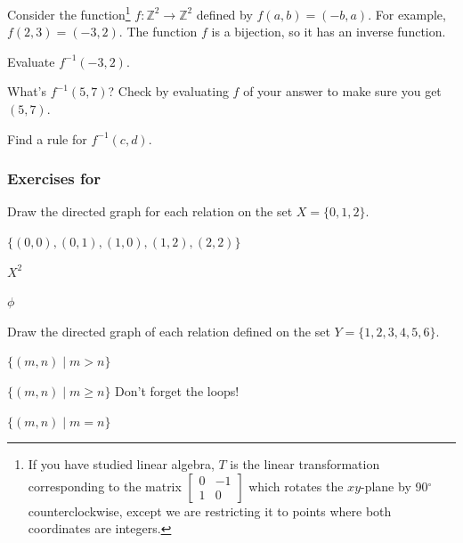 \begin{exer}[\exerE] %
\label{exer_inverse_fn_on_cart_prod}
    Consider the function\footnote{If you have studied linear algebra, $T$ is the linear transformation corresponding to the matrix
        $\left[ \begin{array}{rr} 0 & -1 \\ 1 & 0 \end{array} \right]$ which rotates the $xy$-plane by 90$^\circ$ counterclockwise, except we are restricting it to points where both coordinates are integers.} $f: \mathbb{Z}^2 \to \mathbb{Z}^2$ defined by $f(a,b) = (-b,a)$. For example, $f(2,3) = (-3,2)$. The function $f$ is a bijection, so it has an inverse function.
        \begin{exerpart}
            \item Evaluate $f^{-1}(-3,2)$.
            \item What's $f^{-1}(5,7)$?  Check by evaluating $f$ of your answer to make sure you get $(5,7)$.
            \item Find a rule for $f^{-1}(c,d)$.  
        \end{exerpart}
\end{exer}


\subsubsection*{Exercises for 
\subdefnrelation}

\begin{exer} [\exerP] %
\label{exer_relation_def_list}    
    Draw the directed graph for each relation on the set $X=\{0,1,2\}$.
        \begin{exerpart}
            \item $\{(0,0), (0,1), (1,0), (1,2), (2,2)\}$
            \item $X^2$  
            \item $\phi$
        \end{exerpart}
\end{exer} 

\begin{exer} [\exerP] %
\label{exer_relation_def_set-builder}  
    Draw the directed graph of each relation defined on the set $Y = \{1,2,3,4,5,6\}$.
        \begin{exerpart}
            \item $\{ (m,n) \mid m>n \}$
            \item $\{ (m,n) \mid m\ge n \}$  Don't forget the loops!
            \item $\{ (m,n) \mid m=n \}$
        \end{exerpart}
\end{exer}

